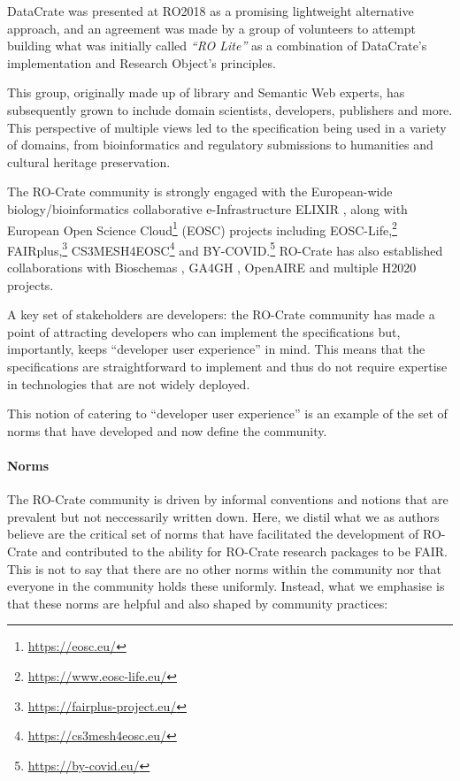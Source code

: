 DataCrate \cite{Sefton 2018} was
presented at RO2018 as a promising lightweight alternative approach, and
an agreement was made by a group of volunteers to attempt building what
was initially called \emph{``RO Lite''} as a combination of DataCrate's
implementation and Research Object's principles.

This group, originally made up of library and Semantic Web experts, has
subsequently grown to include domain scientists, developers, publishers
and more. This perspective of multiple views led to the specification
being used in a variety of domains, from bioinformatics and regulatory
submissions to humanities and cultural heritage preservation.

The RO-Crate community is strongly engaged with the European-wide
biology/bioinformatics collaborative e-Infrastructure ELIXIR
\cite{Crosswell 2012}, along with European Open Science
Cloud\footnote{\url{https://eosc.eu/}} (EOSC) projects including
EOSC-Life,\footnote{\url{https://www.eosc-life.eu/}}
FAIRplus,\footnote{\url{https://fairplus-project.eu/}}
CS3MESH4EOSC\footnote{\url{https://cs3mesh4eosc.eu/}} and
BY-COVID.\footnote{\url{https://by-covid.eu/}} RO-Crate has also established
collaborations with Bioschemas \cite{Gray 2017}, GA4GH
\cite{Rehm 2021}, OpenAIRE \cite{Rettberg 2015}
and multiple H2020 projects.

A key set of stakeholders are developers: the RO-Crate community has
made a point of attracting developers who can implement the
specifications but, importantly, keeps ``developer user experience'' in
mind. This means that the specifications are straightforward to
implement and thus do not require expertise in technologies that are not
widely deployed.

This notion of catering to ``developer user experience'' is an example
of the set of norms that have developed and now define the community.

\paragraph{Norms}\label{ch5:norms}

The RO-Crate community is driven by informal conventions and notions
that are prevalent but not neccessarily written down. Here, we distil
what we as authors believe are the critical set of norms that have
facilitated the development of RO-Crate and contributed to the ability
for RO-Crate research packages to be FAIR. This is not to say that there
are no other norms within the community nor that everyone in the
community holds these uniformly. Instead, what we emphasise is that
these norms are helpful and also shaped by community practices:

